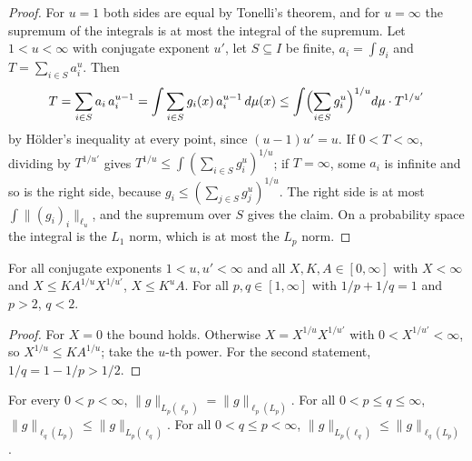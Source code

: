 \begin{proof}
\leanok
For $u = 1$ both sides are equal by Tonelli's theorem, and for $u = \infty$ the supremum of the
integrals is at most the integral of the supremum. Let $1 < u < \infty$ with conjugate exponent
$u'$, let $S \subseteq I$ be finite, $a_i = \int g_i$ and $T = \sum_{i \in S} a_i^u$. Then
\[
  T = \sum_{i \in S} a_i \, a_i^{u-1}
  = \int \sum_{i \in S} g_i(x) \, a_i^{u-1} \, d\mu(x)
  \leq \int \Bigl( \sum_{i \in S} g_i^u \Bigr)^{1/u} d\mu \cdot T^{1/u'}
\]
by H\"older's inequality at every point, since $(u - 1) u' = u$. If $0 < T < \infty$, dividing by
$T^{1/u'}$ gives $T^{1/u} \leq \int (\sum_{i \in S} g_i^u)^{1/u}$; if $T = \infty$, some $a_i$ is
infinite and so is the right side, because $g_i \leq (\sum_{j \in S} g_j^u)^{1/u}$. The right side
is at most $\int \|(g_i)_i\|_{\ell_u}$, and the supremum over $S$ gives the claim. On a
probability space the integral is the $L_1$ norm, which is at most the $L_p$ norm.
\end{proof}

\begin{lemma}
\label{lem:cancel-conjugate-power}
\leanok
For all conjugate exponents $1 < u, u' < \infty$ and all $X, K, A \in [0, \infty]$ with
$X < \infty$ and $X \leq K A^{1/u} X^{1/u'}$, $X \leq K^u A$. For all $p, q \in [1, \infty]$
with $1/p + 1/q = 1$ and $p > 2$, $q < 2$.
\end{lemma}

\begin{proof}
\leanok
For $X = 0$ the bound holds. Otherwise $X = X^{1/u} X^{1/u'}$ with
$0 < X^{1/u'} < \infty$, so $X^{1/u} \leq K A^{1/u}$; take the $u$-th power. For the second
statement, $1/q = 1 - 1/p > 1/2$.
\end{proof}

\begin{theorem}
\label{thm:mixed-norms}
\leanok
{}
For every $0 < p < \infty$,
$\|g\|_{L_p(\ell_p)} = \|g\|_{\ell_p(L_p)}$. For all $0 < p \leq q \leq \infty$,
$\|g\|_{\ell_q(L_p)} \leq \|g\|_{L_p(\ell_q)}$. For all $0 < q \leq p < \infty$,
$\|g\|_{L_p(\ell_q)} \leq \|g\|_{\ell_q(L_p)}$.
\end{theorem}

